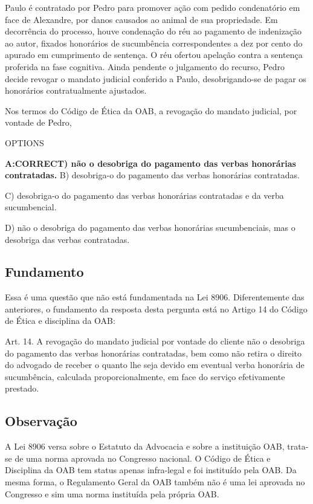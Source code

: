 \documentclass[12pt]{article}
\begin{document}
Paulo é contratado por Pedro para promover ação com pedido 
condenatório em face de Alexandre, por danos causados ao 
animal de sua propriedade. Em decorrência do processo, 
houve condenação do réu ao pagamento de indenização ao 
autor, fixados honorários de sucumbência correspondentes a 
dez por cento do apurado em cumprimento de sentença. O 
réu ofertou apelação contra a sentença proferida na fase 
cognitiva. Ainda pendente o julgamento do recurso, Pedro 
decide revogar o mandato judicial conferido a Paulo, 
desobrigando-se de pagar os honorários contratualmente 
ajustados. 

Nos termos do Código de Ética da OAB, a revogação do 
mandato judicial, por vontade de Pedro, 
 
OPTIONS

\textbf{A:CORRECT) não o desobriga do pagamento das verbas honorárias 
contratadas. 
}
B) desobriga-o do pagamento das verbas honorárias 
contratadas. 

C) desobriga-o do pagamento das verbas honorárias 
contratadas e da verba sucumbencial. 

D) não o desobriga do pagamento das verbas honorárias 
sucumbenciais, mas o desobriga das verbas contratadas. 

\subsection{Fundamento} 

Essa é uma questão que não está fundamentada na Lei 8906. Diferentemente das anteriores, o fundamento da resposta desta pergunta está no Artigo 14 do Código de Ética e disciplina da OAB:

Art. 14. A revogação do mandato judicial por vontade do cliente não o desobriga do pagamento  das  verbas  honorárias  contratadas,  bem  como  não  retira  o  direito  do advogado  de  receber  o  quanto  lhe  seja  devido  em eventual  verba  honorária  de sucumbência, calculada proporcionalmente, em face do serviço efetivamente prestado. 

\subsection{Observação} 

A Lei 8906 versa sobre o Estatuto da Advocacia e sobre a instituição OAB, trata-se de uma norma aprovada no Congresso nacional. O Código de Ética e Disciplina da OAB tem status apenas infra-legal e foi instituído pela OAB. Da mesma forma, o Regulamento Geral da OAB também não é uma lei aprovada no Congresso e sim uma norma instituída pela própria OAB.
\end{document}
